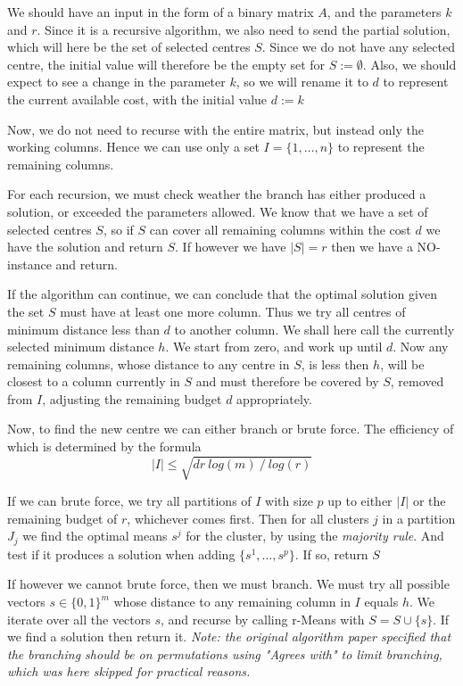 \documentclass[a4paper]{article}
\begin{document}
We should have an input in the form of a binary matrix $A$, and the parameters $k$ and $r$. Since it is a recursive
algorithm, we also need to send the partial solution, which will here be the set of selected centres $S$. Since we do not have
any selected centre, the initial value will therefore be the empty set for $S := \emptyset$. Also, we should expect to see
a change in the parameter $k$, so we will rename it to $d$ to represent the current available cost, with the initial value $d := k$

Now, we do not need to recurse with the entire matrix, but instead only the working columns. Hence we can use only a set $I=\{1,\dots,n\}$
to represent the remaining columns.

For each recursion, we must check weather the branch has either produced a solution, or exceeded the parameters allowed. We know that
we have a set of selected centres $S$, so if $S$ can cover all remaining columns within the cost $d$ we have the solution and return $S$.
If however we have $|S| = r$ then we have a NO-instance and return.

If the algorithm can continue, we can conclude that the optimal solution given the set $S$ must have at least one more column. Thus
we try all centres of minimum distance less than $d$ to another column. We shall here call the currently selected minimum distance $h$.
We start from zero, and work up until $d$. Now any remaining columns, whose distance
to any centre in $S$, is less then $h$, will be closest to a column currently in $S$ and must therefore
be covered by $S$, removed from $I$, adjusting the remaining budget $d$ appropriately.

Now, to find the new centre we can either branch or brute force. The efficiency of which is determined by the formula
\[
    |I| \leq \sqrt{d r ~log(m) ~/ ~log(r)}
\]

If we can brute force, we try all partitions of $I$ with size $p$ up to either $|I|$ or the remaining budget of $r$, whichever comes first. Then
for all clusters $j$ in a partition $J_j$ we find the optimal means $s^j$ for the cluster, by using the \textit{majority rule}. And test if it produces
a solution when adding $\{s^1,\dots,s^p\}$. If so, return $S$

If however we cannot brute force, then we must branch. We must try all possible vectors $s \in \{0,1\}^m$ whose distance to any remaining column in $I$
equals $h$. We iterate over all the vectors $s$, and recurse by calling r-Means with $S= S\cup\{s\}$. If we find a solution then return it. \textit{Note: the original algorithm paper \cite{fomin_golovach_panolan_2020} specified that the
    branching should be on permutations using "Agrees with" to limit branching, which was here skipped for practical reasons.}
\end{document}
